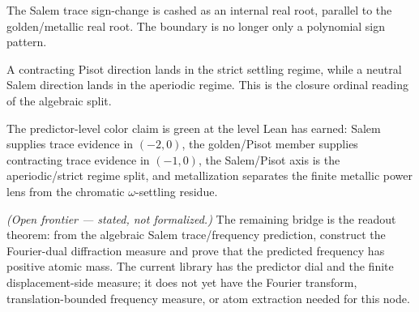 \begin{theorem}\label{thm:salem-trace-real-root}\leanok{}
The Salem trace sign-change is cashed as an internal real root, parallel to
the golden/metallic real root.  The boundary is no longer only a polynomial
sign pattern.
\end{theorem}

\begin{theorem}\label{thm:salem-pisot-regime-split}\leanok{}
A contracting Pisot direction lands in the strict settling regime, while a
neutral Salem direction lands in the aperiodic regime.  This is the closure
ordinal reading of the algebraic split.
\end{theorem}

\begin{theorem}\label{thm:color-predictor-evidence}\leanok{}
The predictor-level color claim is green at the level Lean has earned:
Salem supplies trace evidence in \((-2,0)\), the golden/Pisot member supplies
contracting trace evidence in \((-1,0)\), the Salem/Pisot axis is the
aperiodic/strict regime split, and metallization separates the finite metallic
power lens from the chromatic \(\omega\)-settling residue.
\end{theorem}

\begin{theorem}\label{thm:salem-color-line-fourier-atom}\notready{}
\emph{(Open frontier --- stated, not formalized.)} The remaining bridge is the
readout theorem: from the algebraic Salem trace/frequency prediction, construct
the Fourier-dual diffraction measure and prove that the predicted frequency has
positive atomic mass. The current library has the predictor dial and the finite
displacement-side measure; it does not yet have the Fourier transform,
translation-bounded frequency measure, or atom extraction needed for this node.
\end{theorem}

